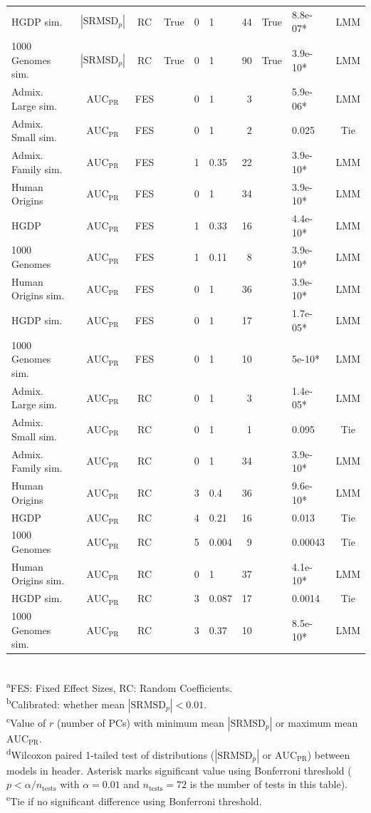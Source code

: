 \documentclass[9pt,lineno]{elife}
\newcommand{\rmsd}{\text{SRMSD}_p}
\newcommand{\auc}{\text{AUC}_\text{PR}}
\begin{document}
\begin{table}
\begin{fullwidth}
\begin{tabular}{lcc|crl|rclc}
      HGDP sim.	&$|\rmsd|$	&RC	&True	&0	&1	&44	&True	&8.8e-07*	&LMM \\
      1000 Genomes sim.	&$|\rmsd|$	&RC	&True	&0	&1	&90	&True	&3.9e-10*	&LMM \\
      Admix. Large sim.	&$\auc$	&FES	&	&0	&1	&3	&	&5.9e-06*	&LMM \\
      Admix. Small sim.	&$\auc$	&FES	&	&0	&1	&2	&	&0.025	&Tie \\
      Admix. Family sim.	&$\auc$	&FES	&	&1	&0.35	&22	&	&3.9e-10*	&LMM \\
      Human Origins	&$\auc$	&FES	&	&0	&1	&34	&	&3.9e-10*	&LMM \\
      HGDP	&$\auc$	&FES	&	&1	&0.33	&16	&	&4.4e-10*	&LMM \\
      1000 Genomes	&$\auc$	&FES	&	&1	&0.11	&8	&	&3.9e-10*	&LMM \\
      Human Origins sim.	&$\auc$	&FES	&	&0	&1	&36	&	&3.9e-10*	&LMM \\
      HGDP sim.	&$\auc$	&FES	&	&0	&1	&17	&	&1.7e-05*	&LMM \\
      1000 Genomes sim.	&$\auc$	&FES	&	&0	&1	&10	&	&5e-10*	&LMM \\
      Admix. Large sim.	&$\auc$	&RC	&	&0	&1	&3	&	&1.4e-05*	&LMM \\
      Admix. Small sim.	&$\auc$	&RC	&	&0	&1	&1	&	&0.095	&Tie \\
      Admix. Family sim.	&$\auc$	&RC	&	&0	&1	&34	&	&3.9e-10*	&LMM \\
      Human Origins	&$\auc$	&RC	&	&3	&0.4	&36	&	&9.6e-10*	&LMM \\
      HGDP	&$\auc$	&RC	&	&4	&0.21	&16	&	&0.013	&Tie \\
      1000 Genomes	&$\auc$	&RC	&	&5	&0.004	&9	&	&0.00043	&Tie \\
      Human Origins sim.	&$\auc$	&RC	&	&0	&1	&37	&	&4.1e-10*	&LMM \\
      HGDP sim.	&$\auc$	&RC	&	&3	&0.087	&17	&	&0.0014	&Tie \\
      1000 Genomes sim.	&$\auc$	&RC	&	&3	&0.37	&10	&	&8.5e-10*	&LMM \\
      \bottomrule
    \end{tabular}
    \\
    \textsuperscript{a}FES: Fixed Effect Sizes, RC: Random Coefficients.\\
    \textsuperscript{b}Calibrated: whether mean $|\rmsd| < 0.01$.\\
    \textsuperscript{c}Value of $r$ (number of PCs) with minimum mean $|\rmsd|$ or maximum mean $\auc$.\\
    \textsuperscript{d}Wilcoxon paired 1-tailed test of distributions ($|\rmsd|$ or $\auc$) between models in header.
    Asterisk marks significant value using Bonferroni threshold ($p < \alpha/n_\text{tests}$ with $\alpha = 0.01$ and $n_\text{tests} = 72$ is the number of tests in this table).\\
    \textsuperscript{e}Tie if no significant difference using Bonferroni threshold.
  \end{fullwidth}
\end{table}
\end{document}
